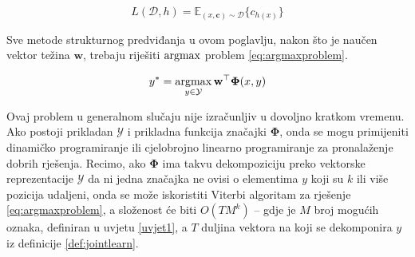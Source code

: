 \begin{equation} \label{eq:funcloss}
  L(\mathcal{D}, h) = \mathbb{E}_{(x, \mathbf{c}) \sim \mathcal{D}} \{c_{h(x)}\}
\end{equation}

\noindent
Sve metode strukturnog predviđanja u ovom poglavlju, nakon što je naučen vektor
težina $\mathbf{w}$, trebaju riješiti $\operatorname*{argmax}$ problem \ref{eq:argmaxproblem}.

\begin{equation}\label{eq:argmaxproblem}
  y\ssymbol{1} = \argmax_{y \in \mathcal{Y}} \mathbf{w}^\top \mathbf{\Phi}(x, y)
\end{equation}

\noindent
Ovaj problem u generalnom slučaju nije izračunljiv u dovoljno kratkom vremenu.
Ako postoji prikladan $\mathcal{Y}$ i prikladna funkcija značajki
$\mathbf{\Phi}$, onda se mogu primijeniti dinamičko programiranje  ili cjelobrojno linearno programiranje  za pronalaženje dobrih rješenja. Recimo, ako $\mathbf{\Phi}$ ima
takvu dekompoziciju preko vektorske reprezentacije $\mathcal{Y}$ da ni jedna
značajka ne ovisi o elementima $y$ koji su $k$ ili više pozicija udaljeni, onda
se može iskoristiti Viterbi algoritam za rješenje \ref{eq:argmaxproblem}, a
složenost će biti $O(T M^k)$ -- gdje je $M$ broj mogućih oznaka, definiran u
uvjetu \ref{uvjet1}, a $T$ duljina vektora na koji se dekomponira $y$ iz
definicije \ref{def:jointlearn}.
